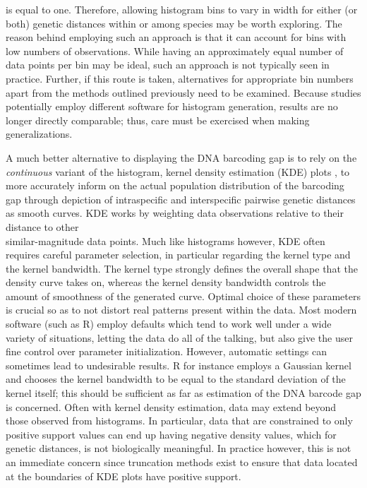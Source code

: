 is equal to one. Therefore, allowing histogram bins to vary in width for either (or both) genetic distances within or among species may be worth exploring. The reason behind employing such an approach is that it can account for bins with low numbers of observations. While having an approximately equal number of data points per bin may be ideal, such an approach is not typically seen in practice. Further, if this route is taken, alternatives for appropriate bin numbers apart from the methods outlined previously need to be examined. Because studies potentially employ different software for histogram generation, results are no longer directly comparable; thus, care must be exercised when making generalizations.



A much better alternative to displaying the DNA barcoding gap is to rely on the \\ \textit{continuous} variant of the histogram, kernel density estimation (KDE) plots \cite{rosenblatt1956remarks, parzen1962estimation}, to more accurately inform on the actual population distribution of the barcoding gap through depiction of intraspecific and interspecific pairwise genetic distances as smooth curves. KDE works by weighting data observations relative to their distance to other \\ similar-magnitude data points. Much like histograms however, KDE often requires careful parameter selection, in particular regarding the kernel type and the kernel bandwidth. The kernel type strongly defines the overall shape that the density curve takes on, whereas the kernel density bandwidth controls the amount of smoothness of the generated curve. Optimal choice of these parameters is crucial so as to not distort real patterns present within the data. Most modern software (such as R) employ defaults which tend to work well under a wide variety of situations, letting the data do all of the talking, but also give the user fine control over parameter initialization. However, automatic settings can sometimes lead to undesirable results. R for instance employs a Gaussian kernel and chooses the kernel bandwidth to be equal to the standard deviation of the kernel itself; this should be sufficient as far as estimation of the DNA barcode gap is concerned. Often with kernel density estimation, data may extend beyond those observed from histograms. In particular, data that are constrained to only positive support values can end up having negative density values, which for genetic distances, is not biologically meaningful. In practice however, this is not an immediate concern since truncation methods exist to ensure that data located at the boundaries of KDE plots have positive support.    



